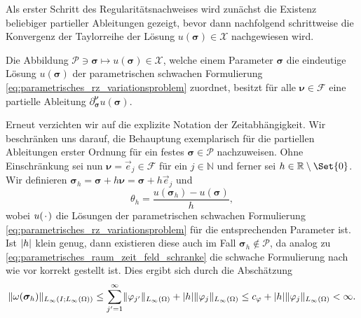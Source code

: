 \documentclass[../main.tex]{subfiles}
\begin{document}
Als erster Schritt des Regularitätsnachweises wird zunächst die Existenz beliebiger partieller Ableitungen gezeigt, bevor dann nachfolgend schrittweise die Konvergenz der Taylorreihe der Lösung $u(\bm \sigma) \in \mathcal X$ nachgewiesen wird.

\begin{Satz}
\label{satz:existenz_partieller_ableitungen}
    Die Abbildung $\mathcal P \ni \bm\sigma \mapsto u(\bm\sigma) \in \mathcal X$, welche einem Parameter $\bm\sigma$ die eindeutige Lösung $u(\bm\sigma)$ der parametrischen schwachen Formulierung \cref{eq:parametrisches_rz_variationsproblem} zuordnet, besitzt für alle $\bm\nu \in \mathcal F$ eine partielle Ableitung $\partial^{\bm\nu}_{\bm\sigma} u(\bm\sigma)$.

    \begin{Beweis}
        Erneut verzichten wir auf die explizite Notation der Zeitabhängigkeit.
        Wir beschränken uns darauf, die Behauptung exemplarisch für die partiellen Ableitungen erster Ordnung für ein festes $\bm\sigma \in \mathcal P$ nachzuweisen.
        Ohne Einschränkung sei nun $\bm\nu = \vec{e}_{j} \in \mathcal F$ für ein $j \in \mathbb{N}$ und ferner sei $h \in \mathbb{R} \setminus \Set{ 0 }$.
        Wir definieren $\bm\sigma_{h} = \bm\sigma + h \bm\nu = \bm\sigma + h \vec e_{j}$ und
        \begin{equation}
            \theta_{h} = \frac{u(\bm\sigma_{h}) - u(\bm\sigma)}{h},
        \end{equation}
        wobei $u({\mkern2mu\cdot\mkern2mu})$ die Lösungen der parametrischen schwachen Formulierung \cref{eq:parametrisches_rz_variationsproblem} für die entsprechenden Parameter ist.
        Ist $\lvert h\rvert$ klein genug, dann existieren diese auch im Fall $\bm\sigma_{h} \not\in \mathcal P$, da analog zu \cref{eq:parametrisches_raum_zeit_feld_schranke} die schwache Formulierung nach wie vor korrekt gestellt ist.
        Dies ergibt sich durch die Abschätzung
        \begin{equation}
            \lVert\omega(\bm \sigma_{h})\rVert_{L_{\infty}(I; L_{\infty}(\Omega))} \leq \sum_{j' = 1}^{\infty} \lVert\varphi_{j'}\rVert_{L_{\infty}(\Omega)} + \lvert h\rvert \lVert\varphi_{j}\rVert_{L_{\infty}(\Omega)}\leq c_{\varphi} + \lvert h\rvert \lVert\varphi_{j}\rVert_{L_{\infty}(\Omega)} < \infty.
        \end{equation}


\end{Beweis}
\end{Satz}
\end{document}
